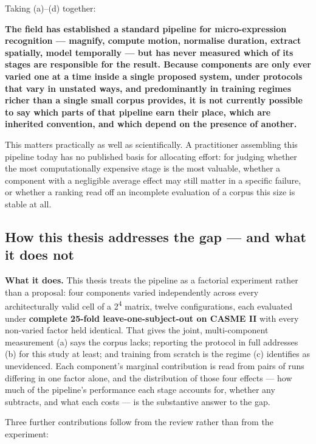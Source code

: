 Taking (a)--(d) together:

\textbf{The field has established a standard pipeline for micro-expression recognition --- magnify, compute motion, normalise duration, extract spatially, model temporally --- but has never measured which of its stages are responsible for the result. Because components are only ever varied one at a time inside a single proposed system, under protocols that vary in unstated ways, and predominantly in training regimes richer than a single small corpus provides, it is not currently possible to say which parts of that pipeline earn their place, which are inherited convention, and which depend on the presence of another.}

This matters practically as well as scientifically. A practitioner assembling this pipeline today has no published basis for allocating effort: for judging whether the most computationally expensive stage is the most valuable, whether a component with a negligible average effect may still matter in a specific failure, or whether a ranking read off an incomplete evaluation of a corpus this size is stable at all.

\subsection{How this thesis addresses the gap --- and what it does not}
\label{sec:addressing-gap}

\textbf{What it does.} This thesis treats the pipeline as a factorial experiment rather than a proposal: four components varied independently across every architecturally valid cell of a 2\textsuperscript{4} matrix, twelve configurations, each evaluated under \textbf{complete 25-fold leave-one-subject-out on CASME II} with every non-varied factor held identical. That gives the joint, multi-component measurement (a) says the corpus lacks; reporting the protocol in full addresses (b) for this study at least; and training from scratch is the regime (c) identifies as unevidenced. Each component's marginal contribution is read from pairs of runs differing in one factor alone, and the distribution of those four effects --- how much of the pipeline's performance each stage accounts for, whether any subtracts, and what each costs --- is the substantive answer to the gap.

Three further contributions follow from the review rather than from the experiment:

